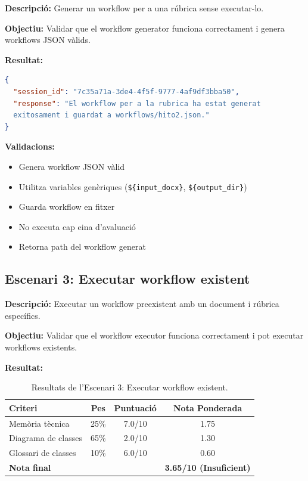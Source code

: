 \documentclass[12pt,a4paper,twoside]{report}
\begin{document}
\textbf{Descripci\'o:} Generar un workflow per a una r\'ubrica sense executar-lo.

\textbf{Objectiu:} Validar que el workflow generator funciona correctament i genera workflows JSON v\`alids.

\textbf{Resultat:}
\begin{lstlisting}[language=JSON]
{
  "session_id": "7c35a71a-3de4-4f5f-9777-4af9df3bba50",
  "response": "El workflow per a la rubrica ha estat generat
  exitosament i guardat a workflows/hito2.json."
}
\end{lstlisting}

\textbf{Validacions:}
\begin{itemize}
    \item Genera workflow JSON v\`alid
    \item Utilitza variables gen\`eriques (\texttt{\$\{input\_docx\}}, \texttt{\$\{output\_dir\}})
    \item Guarda workflow en fitxer
    \item No executa cap eina d'avaluaci\'o
    \item Retorna path del workflow generat
\end{itemize}

\subsection{Escenari 3: Executar workflow existent}

\textbf{Descripci\'o:} Executar un workflow preexistent amb un document i r\'ubrica espec\'ifics.

\textbf{Objectiu:} Validar que el workflow executor funciona correctament i pot executar workflows existents.

\textbf{Resultat:}

\begin{table}[H]
\centering
\caption{Resultats de l'Escenari 3: Executar workflow existent.}
\label{tab:escenari3}
\begin{tabular}{@{}lccc@{}}
\toprule
\textbf{Criteri} & \textbf{Pes} & \textbf{Puntuaci\'o} & \textbf{Nota Ponderada} \\
\midrule
Mem\`oria t\`ecnica & 25\% & 7.0/10 & 1.75 \\
Diagrama de classes & 65\% & 2.0/10 & 1.30 \\
Glossari de classes & 10\% & 6.0/10 & 0.60 \\
\midrule
\textbf{Nota final} & & & \textbf{3.65/10 (Insuficient)} \\
\bottomrule
\end{tabular}
\end{table}
\end{document}
